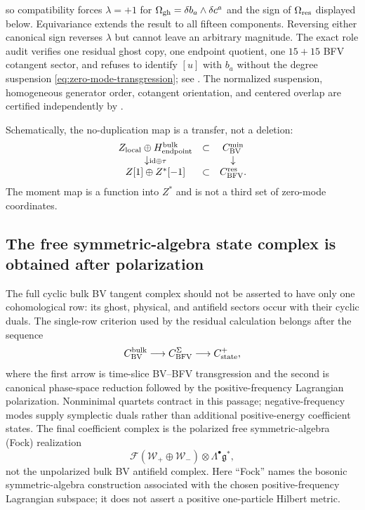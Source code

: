 \documentclass[11pt]{article}
\theoremstyle{definition}
\theoremstyle{remark}
\newcommand{\g}{\mathfrak g}
\newcommand{\W}{\mathcal W}
\newcommand{\F}{\mathcal F}
\begin{document}
so compatibility forces $\lambda=+1$ for
$\Omega_{\rm gh}=\delta b_a\wedge\delta c^a$ and the sign of
$\Omega_{\rm res}$ displayed below.  Equivariance extends the result to all
fifteen components.  Reversing either canonical sign reverses $\lambda$ but
cannot leave an arbitrary magnitude.  The exact role audit verifies one
residual ghost copy, one endpoint quotient, one $15+15$ BFV cotangent
sector, and refuses to identify $[u]$ with $b_a$ without the degree
suspension \eqref{eq:zero-mode-transgression}; see
.
The normalized suspension, homogeneous generator order, cotangent
orientation, and centered overlap are certified independently by
.

Schematically, the no-duplication map is a transfer, not a deletion:
\begin{equation}\label{eq:zero-mode-replacement}
 \begin{array}{ccc}
 Z_{\rm local}\oplus H^{\rm bulk}_{\rm endpoint}
 &\subset&C^{\rm min}_{\rm BV}\\
 \downarrow\scriptstyle{\mathrm{id}\oplus\tau}&&\downarrow\\
 Z[1]\oplus Z^*[-1]&\subset&C^{\rm res}_{\rm BFV}.
 \end{array}
\end{equation}
The moment map is a function into $Z^*$ and is not a third set of zero-mode
coordinates.

\subsection{The free symmetric-algebra state complex is obtained after polarization}

The full cyclic bulk BV tangent complex should not be asserted to have only
one cohomological row: its ghost, physical, and antifield sectors occur with
their cyclic duals.  The single-row criterion used by the residual
calculation belongs after the sequence
\begin{equation}\label{eq:BV-BFV-polarization}
 C^{\rm bulk}_{\rm BV}
 \longrightarrow C^\Sigma_{\rm BFV}
 \longrightarrow C^{+}_{\rm state},
\end{equation}
where the first arrow is time-slice BV--BFV transgression and the second is
canonical phase-space reduction followed by the positive-frequency
Lagrangian polarization.  Nonminimal quartets contract in this passage;
negative-frequency modes supply symplectic duals rather than additional
positive-energy coefficient states.  The final coefficient complex is the
polarized free symmetric-algebra (Fock) realization
\begin{equation}
 \F(\W_+\oplus\W_-)\otimes\Lambda^\bullet\g^*,
\end{equation}
not the unpolarized bulk BV antifield complex.  Here ``Fock'' names
the bosonic symmetric-algebra construction associated with the chosen
positive-frequency Lagrangian subspace; it does not assert a positive
one-particle Hilbert metric.
\end{document}
